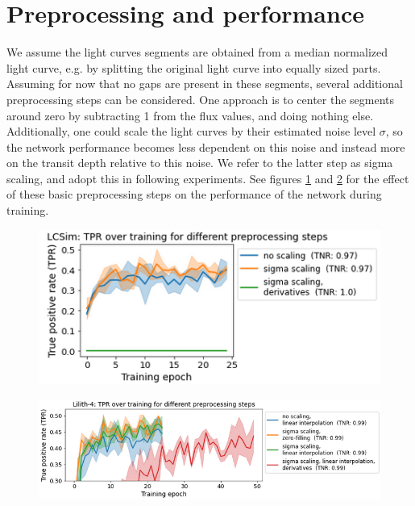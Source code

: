 
\section{Preprocessing and performance}
\label{sec:exp_preprocessing}

We assume the light curves segments are obtained from a median normalized light curve, e.g. by splitting the original light curve into equally sized parts. Assuming for now that no gaps are present in these segments, several additional preprocessing steps can be considered. One approach is to center the segments around zero by subtracting 1 from the flux values, and doing nothing else. Additionally, one could scale the light curves by their estimated noise level $\sigma$, so the network performance becomes less dependent on this noise and instead more on the transit depth relative to this noise. We refer to the latter step as sigma scaling, and adopt this in following experiments.  See figures \ref{fig:preprocessing-scaling_lcsim} and \ref{fig:preprocessing-scaling_lilith} for the effect of these basic preprocessing steps on the performance of the network during training. 

\begin{figure}
    \centering
    \includegraphics[width=0.5\linewidth]{Experiments/Figures/Preprocessing/preprocessing_lcsim_valid.png}
    \caption{}
    \label{fig:preprocessing-scaling_lcsim}
\end{figure}

\begin{figure}
    \centering
    \includegraphics[width=0.75\linewidth]{Experiments/Figures/Preprocessing/preprocessing_lilith_valid_2.png}
    \caption{}
    \label{fig:preprocessing-scaling_lilith}
\end{figure}

